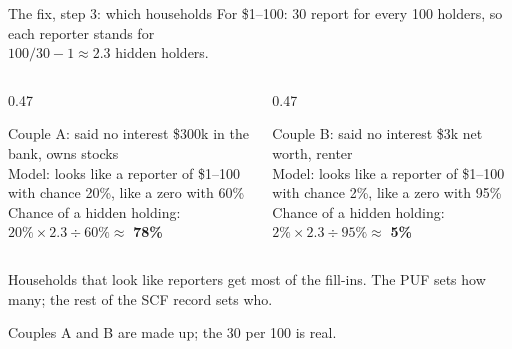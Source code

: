 \documentclass[11pt,aspectratio=169]{beamer}
\newcommand{\slidenote}[1]{\par\vfill{\scriptsize\color{yalegrey}#1}}
\begin{document}
\begin{frame}{The fix, step 3: which households}
  For \$1--100: 30 report for every 100 holders, so each reporter stands for\\
  $100/30 - 1 \approx 2.3$ hidden holders.

  \vspace{0.8em}
  \begin{columns}[T]
    \begin{column}{0.47\textwidth}
      \begin{block}{Couple A: said no interest}
        \$300k in the bank, owns stocks\\[3pt]
        Model: looks like a reporter of \$1--100 with chance 20\%, like a zero with 60\%\\[3pt]
        Chance of a hidden holding:\\
        $20\% \times 2.3 \div 60\% \approx$ \textbf{78\%}
      \end{block}
    \end{column}
    \begin{column}{0.47\textwidth}
      \begin{block}{Couple B: said no interest}
        \$3k net worth, renter\\[3pt]
        Model: looks like a reporter of \$1--100 with chance 2\%, like a zero with 95\%\\[3pt]
        Chance of a hidden holding:\\
        $2\% \times 2.3 \div 95\% \approx$ \textbf{5\%}
      \end{block}
    \end{column}
  \end{columns}

  \vspace{0.6em}
  Households that look like reporters get most of the fill-ins. The PUF sets how many;
  the rest of the SCF record sets who.
  \slidenote{Couples A and B are made up; the 30 per 100 is real.}
\end{frame}
\end{document}
